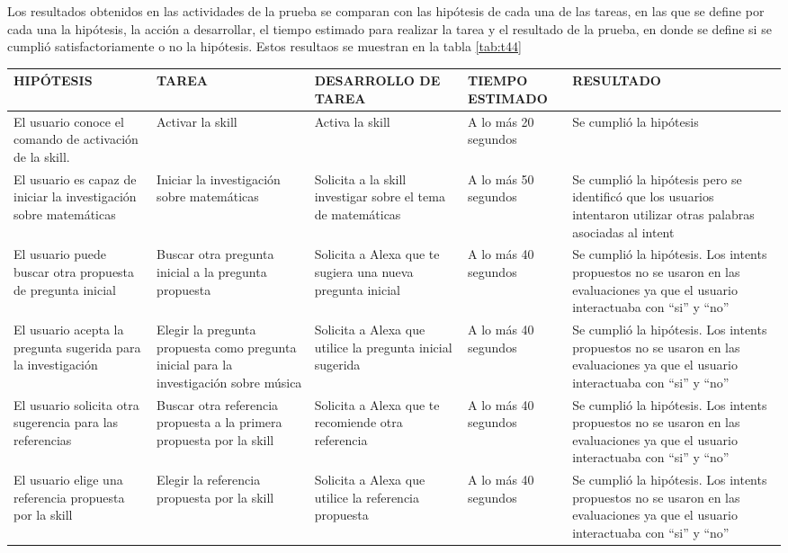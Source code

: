Los resultados obtenidos en las actividades de la prueba se comparan con las hipótesis de cada una de las tareas, en las que se define por cada una la hipótesis, la acción a desarrollar, el tiempo estimado para realizar la tarea y el resultado de la prueba, en donde se define si se cumplió satisfactoriamente o no la hipótesis. Estos resultaos se muestran en la tabla \ref{tab:t44}

\begin{table}
  \begin{center}
    \begin{tabular}{ | p{3cm} | p{3cm} | p{3cm} | p{2cm} | p{4cm} | }
      \hline
      HIPÓTESIS & TAREA & DESARROLLO DE TAREA & TIEMPO ESTIMADO & RESULTADO \\ \hline
      El usuario conoce el comando de activación de la skill. & Activar la skill & Activa la skill & A lo más 20 segundos & Se cumplió la hipótesis \\ \hline
      El usuario es capaz de iniciar la investigación sobre matemáticas & Iniciar la investigación sobre matemáticas & Solicita a la skill investigar sobre el tema de matemáticas & A lo más 50 segundos & Se cumplió la hipótesis pero se identificó que los usuarios intentaron utilizar otras palabras asociadas al intent \\ \hline
      El usuario puede buscar otra propuesta de pregunta inicial & Buscar otra pregunta inicial a la pregunta propuesta & Solicita a Alexa que te sugiera una nueva pregunta inicial & A lo más 40 segundos & Se cumplió la hipótesis. Los intents propuestos no se usaron en las evaluaciones ya que el usuario interactuaba con “si” y “no” \\ \hline
      El usuario acepta la pregunta sugerida para la investigación & Elegir la pregunta propuesta como pregunta inicial para la investigación sobre música & Solicita a Alexa que utilice la pregunta inicial sugerida & A lo más 40 segundos & Se cumplió la hipótesis. Los intents propuestos no se usaron en las evaluaciones ya que el usuario interactuaba con “si” y “no” \\ \hline
      El usuario solicita otra sugerencia para las referencias & Buscar otra referencia propuesta a la primera propuesta por la skill & Solicita a Alexa que te recomiende otra referencia & A lo más 40 segundos & Se cumplió la hipótesis. Los intents propuestos no se usaron en las evaluaciones ya que el usuario interactuaba con “si” y “no” \\ \hline
      El usuario elige una referencia propuesta por la skill & Elegir la referencia propuesta por la skill & Solicita a Alexa que utilice la referencia propuesta & A lo más 40 segundos & Se cumplió la hipótesis. Los intents propuestos no se usaron en las evaluaciones ya que el usuario interactuaba con “si” y “no” \\ \hline
    \end{tabular}
  \end{center}
\end{table}

